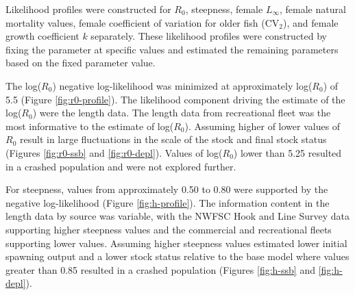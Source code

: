 \documentclass[11pt,
  english,
  a4paper,
]{article}
\begin{document}
\leavevmode\tagmcend\tagstructend


Likelihood profiles were constructed for {\(R_0\)\leavevmode\tagmcend\tagstructend}, steepness, female {\(L_{\infty}\)\leavevmode\tagmcend\tagstructend}, female natural mortality values, female coefficient of variation for older fish ({\(\text{CV}_2\)\leavevmode\tagmcend\tagstructend}), and female growth coefficient {\(k\)\leavevmode\tagmcend\tagstructend} separately. These likelihood profiles were constructed by fixing the parameter at specific values and estimated the remaining parameters based on the fixed parameter value.

\leavevmode\tagmcend\tagstructend\par


The log({\(R_0\)\leavevmode\tagmcend\tagstructend}) negative log-likelihood was minimized at approximately log({\(R_0\)\leavevmode\tagmcend\tagstructend}) of 5.5 (Figure \ref{fig:r0-profile}). The likelihood component driving the estimate of the log({\(R_0\)\leavevmode\tagmcend\tagstructend}) were the length data. The length data from recreational fleet was the most informative to the estimate of log({\(R_0\)\leavevmode\tagmcend\tagstructend}). Assuming higher of lower values of {\(R_0\)\leavevmode\tagmcend\tagstructend} result in large fluctuations in the scale of the stock and final stock status (Figures \ref{fig:r0-ssb} and \ref{fig:r0-depl}). Values of log({\(R_0\)\leavevmode\tagmcend\tagstructend}) lower than 5.25 resulted in a crashed population and were not explored further.

\leavevmode\tagmcend\tagstructend\par


For steepness, values from approximately 0.50 to 0.80 were supported by the negative log-likelihood (Figure \ref{fig:h-profile}). The information content in the length data by source was variable, with the NWFSC Hook and Line Survey data supporting higher steepness values and the commercial and recreational fleets supporting lower values. Assuming higher steepness values estimated lower initial spawning output and a lower stock status relative to the base model where values greater than 0.85 resulted in a crashed population (Figures \ref{fig:h-ssb} and \ref{fig:h-depl}).
\end{document}
